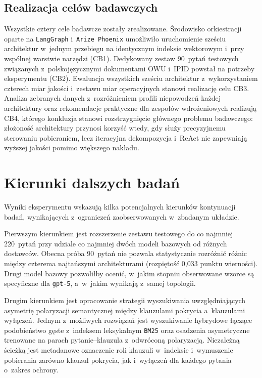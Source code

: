 \subsection{Realizacja celów badawczych}\label{subsec:realizacja-celow-badawczych}

Wszystkie cztery cele badawcze zostały zrealizowane. Środowisko orkiestracji
oparte na \texttt{LangGraph} i~\texttt{Arize Phoenix} umożliwiło uruchomienie
sześciu architektur w~jednym przebiegu na identycznym indeksie wektorowym
i~przy wspólnej warstwie narzędzi (CB1). Dedykowany zestaw 90~pytań testowych
związanych z~polskojęzycznymi dokumentami OWU i~IPID powstał na potrzeby
eksperymentu (CB2). Ewaluacja wszystkich sześciu architektur z~wykorzystaniem
czterech miar jakości i~zestawu miar operacyjnych stanowi realizację celu CB3.
Analiza zebranych danych z~rozróżnieniem profili niepowodzeń każdej
architektury oraz rekomendacje praktyczne dla zespołów wdrożeniowych realizują
CB4, którego konkluzja stanowi rozstrzygnięcie głównego problemu badawczego:
złożoność architektury przynosi korzyść wtedy, gdy służy precyzyjnemu
sterowaniu pobieraniem, lecz iteracyjna dekompozycja i~ReAct nie zapewniają
wyższej jakości pomimo większego nakładu.

\section{Kierunki dalszych badań}\label{sec:kierunki-dalszych-badan}

Wyniki eksperymentu wskazują kilka potencjalnych kierunków kontynuacji badań,
wynikających z~ograniczeń zaobserwowanych w~zbadanym układzie.

Pierwszym kierunkiem jest rozszerzenie zestawu testowego do co najmniej
220~pytań przy udziale co najmniej dwóch modeli bazowych od różnych dostawców.
Obecna próba 90~pytań nie pozwala statystycznie rozróżnić różnic między
czterema najtańszymi architekturami (rozpiętość 0{,}033 punktu wierności).
Drugi model bazowy pozwoliłby ocenić, w~jakim stopniu obserwowane wzorce są
specyficzne dla \texttt{gpt-5}, a~w~jakim wynikają z~samej topologii.

Drugim kierunkiem jest opracowanie strategii wyszukiwania uwzględniających
asymetrię polaryzacji semantycznej między klauzulami pokrycia a~klauzulami
wyłączeń. Jednym z~możliwych rozwiązań jest wyszukiwanie hybrydowe łączące
podobieństwo gęste z~indeksem leksykalnym \texttt{BM25} oraz osadzenia
asymetryczne trenowane na parach pytanie--klauzula z~odwróconą polaryzacją.
Niezależną ścieżką jest metadanowe oznaczenie roli klauzuli w~indeksie
i~wymuszenie pobierania zarówno klauzul pokrycia, jak i~wyłączeń dla każdego
pytania o~zakres ochrony.

